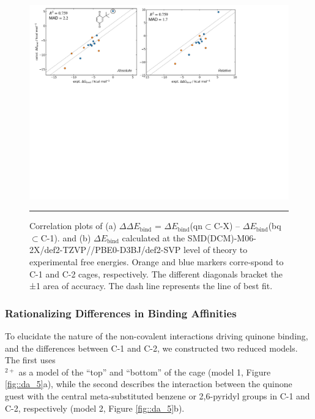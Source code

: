 \documentclass[../../main.tex]{subfiles}
\begin{document}
\begin{figure}[h!]
	\vspace{0.4cm}
	\centering
	\includegraphics[width=\textwidth]{3/da/figs/fig4/fig4.pdf}
	\vspace{0.2cm}
	\hrule
	\caption{Correlation plots of (a) $\Delta\Delta E_\text{bind}$ = $\Delta E_\text{bind}$(qn$\subset$C-X) – $\Delta E_\text{bind}$(bq$\subset$C-1). and (b) $\Delta E_\text{bind}$ calculated at the SMD(DCM)-M06-2X/def2-TZVP//PBE0-D3BJ/def2-SVP level of theory to experimental free energies. Orange and blue markers corre-spond to C-1 and C-2 cages, respectively. The different diagonals bracket the ±1 \kcalx area of accuracy. The dash line represents the line of best fit.}
	\label{fig::da_4}
\end{figure}


\subsubsection{Rationalizing Differences in Binding Affinities}
 To elucidate the nature of the non-covalent interactions driving quinone binding, and the differences between C-1 and C-2, we constructed two reduced models. The first uses\\ [Pd(pyridine)$_4$]$^{2+}$ as a model of the “top” and “bottom” of the cage (model 1, Figure \ref{fig::da_5}a), while the second describes the interaction between the quinone guest with the central meta-substituted benzene or 2,6-pyridyl groups in C-1 and C-2, respectively (model 2, Figure \ref{fig::da_5}b). 
\end{document}
